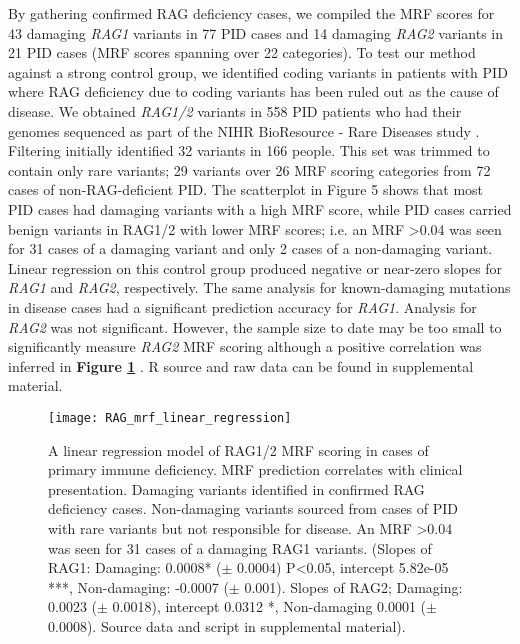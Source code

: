 \documentclass[preprint,11pt,fleqn]{elsarticle}
\begin{document}
By gathering confirmed RAG deficiency cases, we compiled the MRF scores for 43 damaging \textit{RAG1} variants in 77 PID cases and 14 damaging \textit{RAG2} variants in 21 PID cases (MRF scores spanning over 22 categories). 
To test our method against a strong control group, we identified coding variants in patients with PID where RAG deficiency due to coding variants has been ruled out as the cause of disease.  
We obtained \textit{RAG1/2} variants in 558 PID patients who had their genomes sequenced as part of the NIHR BioResource - Rare Diseases study 
\citep{lawless2018prevalence}.
Filtering initially identified 32 variants in 166 people. 
This set was trimmed to contain only rare variants; 29 variants over 26 MRF scoring categories from 72 cases of non-RAG-deficient PID.
The scatterplot in Figure 5 shows that most PID cases had damaging variants with a high MRF score, while PID cases carried benign variants in RAG1/2 with lower MRF scores; i.e. an MRF >0.04 was seen for 31 cases of a damaging variant and only 2 cases of a non-damaging variant. 
Linear regression on this control group produced negative or near-zero slopes for \textit{RAG1} and \textit{RAG2}, respectively. 
The same analysis for known-damaging mutations in disease cases had a significant prediction accuracy for \textit{RAG1}.
Analysis for \textit{RAG2} was not significant.  However, the sample size to date may be too small to significantly measure \textit{RAG2} MRF scoring although a positive correlation was inferred in 
\textbf{Figure \ref{fig:RAG_mrf_linear_regression}} 
\citep{altman1995statistics}.
R source and raw data can be found in supplemental material.

\begin{figure}[h]
\hspace*{1cm}   %
	\texttt{[image: RAG\_mrf\_linear\_regression]}
	\caption{A linear regression model of RAG1/2 MRF scoring in cases of primary immune deficiency. 
MRF prediction correlates with clinical presentation.
Damaging variants identified in confirmed RAG deficiency cases. 
Non-damaging variants sourced from cases of PID with rare variants but not responsible for disease.
An MRF >0.04 was seen for 31 cases of a damaging RAG1 variants.
(Slopes of RAG1: Damaging: 0.0008* ($\pm$ 0.0004) P<0.05, intercept 5.82e-05 ***, Non-damaging: -0.0007 ($\pm$ 0.001).  Slopes of RAG2; Damaging: 0.0023 ($\pm$ 0.0018),  intercept 0.0312 *, Non-damaging 0.0001 ($\pm$ 0.0008). Source data and script in supplemental material).}
	\label{fig:RAG_mrf_linear_regression}
\end{figure}
\clearpage 
\end{document}
